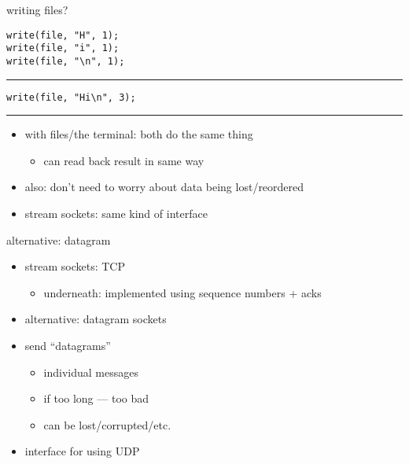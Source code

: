 \begin{frame}[fragile]{writing files?}
\lstset{language=C,style=small}
\begin{lstlisting}
write(file, "H", 1);
write(file, "i", 1);
write(file, "\n", 1);
\end{lstlisting}
\hrule
\begin{lstlisting}
write(file, "Hi\n", 3);
\end{lstlisting}
\hrule
\begin{itemize}
    \item with files/the terminal: both do the same thing
        \begin{itemize}
        \item can read back result in same way
        \end{itemize}
    \item also: don't need to worry about data being lost/reordered
    \item stream sockets: same kind of interface
\end{itemize}
\end{frame}


\begin{frame}{alternative: datagram}
    \begin{itemize}
    \item stream sockets: TCP
        \begin{itemize}
        \item underneath: implemented using sequence numbers + acks
        \end{itemize}
    \vspace{.5cm}
    \item alternative: datagram sockets
    \item send ``datagrams''
        \begin{itemize}
        \item individual messages
        \item if too long --- too bad
        \item can be lost/corrupted/etc.
        \end{itemize}
    \item interface for using UDP
    \end{itemize}
\end{frame}
